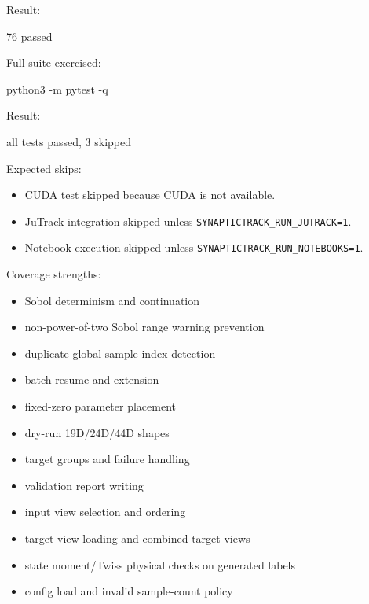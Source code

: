 \documentclass[
]{article}
\newenvironment{Shaded}{}{}
\newcommand{\NormalTok}[1]{#1}
\providecommand{\tightlist}{%
  \setlength{\itemsep}{0pt}\setlength{\parskip}{0pt}}
\begin{document}
Result:

\begin{Shaded}
\begin{Highlighting}[]
\NormalTok{76 passed}
\end{Highlighting}
\end{Shaded}

Full suite exercised:

\begin{Shaded}
\begin{Highlighting}[]
\NormalTok{python3 {-}m pytest {-}q}
\end{Highlighting}
\end{Shaded}

Result:

\begin{Shaded}
\begin{Highlighting}[]
\NormalTok{all tests passed, 3 skipped}
\end{Highlighting}
\end{Shaded}

Expected skips:

\begin{itemize}
\tightlist
\item
  CUDA test skipped because CUDA is not available.
\item
  JuTrack integration skipped unless
  \texttt{SYNAPTICTRACK\_RUN\_JUTRACK=1}.
\item
  Notebook execution skipped unless
  \texttt{SYNAPTICTRACK\_RUN\_NOTEBOOKS=1}.
\end{itemize}

Coverage strengths:

\begin{itemize}
\tightlist
\item
  Sobol determinism and continuation
\item
  non-power-of-two Sobol range warning prevention
\item
  duplicate global sample index detection
\item
  batch resume and extension
\item
  fixed-zero parameter placement
\item
  dry-run 19D/24D/44D shapes
\item
  target groups and failure handling
\item
  validation report writing
\item
  input view selection and ordering
\item
  target view loading and combined target views
\item
  state moment/Twiss physical checks on generated labels
\item
  config load and invalid sample-count policy
\end{itemize}
\end{document}
